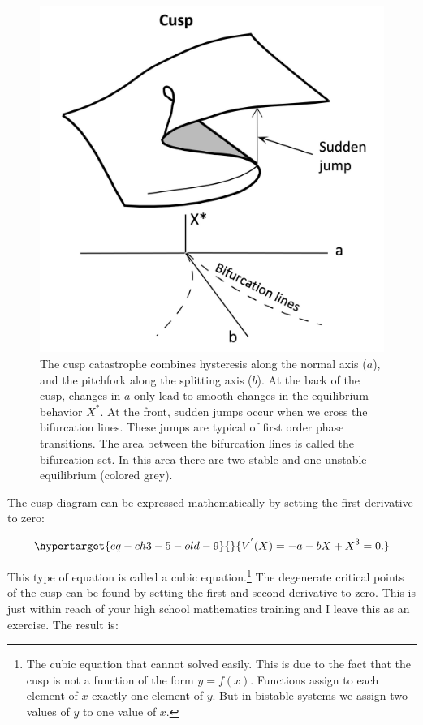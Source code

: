 \documentclass[
  a4paper,
  DIV=11,
  numbers=noendperiod]{scrreprt}
\begin{document}
\begin{figure}

{\centering \includegraphics{media/ch3/image10.jpg}

}

\caption{\label{fig-ch3-img10-old-22}The cusp catastrophe combines
hysteresis along the normal axis (\(a\)), and the pitchfork along the
splitting axis (\(b\)). At the back of the cusp, changes in \(a\) only
lead to smooth changes in the equilibrium behavior \(X^{*}\). At the
front, sudden jumps occur when we cross the bifurcation lines. These
jumps are typical of first order phase transitions. The area between the
bifurcation lines is called the bifurcation set. In this area there are
two stable and one unstable equilibrium (colored grey).}

\end{figure}

The cusp diagram can be expressed mathematically by setting the first
derivative to zero:

\begin{equation}\protect\hypertarget{eq-ch3-5-old-9}{}{
V^{'}(X) = {- a - bX + X}^{3} = 0.
}\label{eq-ch3-5-old-9}\end{equation}

This type of equation is called a cubic equation.\footnote{The cubic
  equation that cannot solved easily. This is due to the fact that the
  cusp is not a function of the form \(y = f(x)\). Functions assign to
  each element of \(x\) exactly one element of \(y\). But in bistable
  systems we assign two values of \(y\) to one value of \(x\).} The
degenerate critical points of the cusp can be found by setting the first
and second derivative to zero. This is just within reach of your high
school mathematics training and I leave this as an exercise. The result
is:
\end{document}
